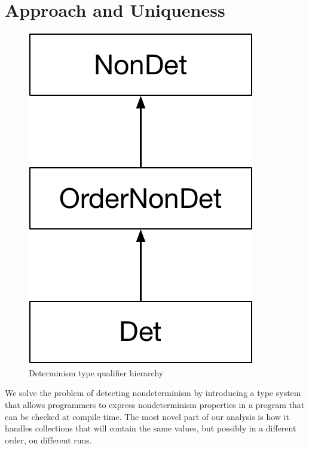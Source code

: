 \section{Approach and Uniqueness\label{sec:approach}}
\begin{figure}
    \begin{center}
        \includegraphics[scale=0.37]{detHierarchy}
    \end{center}
    \caption{Determinism type qualifier hierarchy}
    \label{fig:determinism-hierarchy}
\end{figure}

We solve the problem of detecting nondeterminism by introducing a type system
that allows programmers to express nondeterminism properties in a program that can be checked
at compile time.
The most novel part of our analysis is how it handles collections that will
contain the same values, but
possibly in a different order, on different runs.



